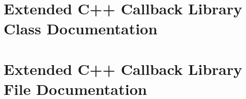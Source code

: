 \documentclass[a4paper]{book}
\begin{document}
\chapter{Extended C++ Callback Library Class Documentation}





























\chapter{Extended C++ Callback Library File Documentation}































\printindex
\end{document}
